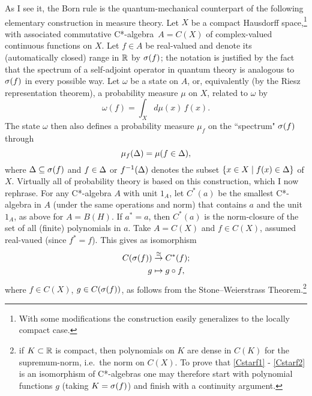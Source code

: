 \documentclass[11pt,a4paper]{article}
\numberwithin{equation}{section}
\newcommand{\er}{\eqref}
\newcommand{\beq}{\begin{equation}}
\newcommand{\eeq}{\end{equation}}
\newcommand{\raw}{\rightarrow}
\newcommand{\ca}{C*-algebra} \newcommand{\jba}{JB-algebra}
\newcommand{\om}{\omega} \newcommand{\Om}{\Omega}
\newcommand{\inv}{^{-1}}
\begin{document}
As I see it, the Born rule is the quantum-mechanical counterpart of the following elementary construction in measure theory. 
Let $X$ be a compact Hausdorff space,\footnote{With some modifications the construction easily generalizes to the locally compact case.} with associated commutative \ca\ $A=C(X)$ of complex-valued continuous functions on $X$. 
Let $f\in A$ be real-valued and denote its (automatically closed) range in ${\mathbb R}$ by $\sigma(f)$; the notation is justified by the fact that the spectrum of a self-adjoint operator in quantum theory is analogous to $\sigma(f)$ in every possible way. Let $\om$ be a state on $A$, or, equivalently (by the Riesz representation theorem), a probability measure $\mu$ on $X$, related to $\om$ by 
\beq
\om(f)=\int_X d\mu(x)\, f(x).
\eeq 
The state $\om$ then also defines a probability measure $\mu_f$ on the ``spectrum" $\sigma(f)$ through
  \begin{equation}
\mu_f(\Delta)=\mu(f\in \Delta), \label{muf}
\end{equation}
where  $\Delta\subseteq \sigma(f)$ and $f\in\Delta$ or $f\inv(\Dl)$ denotes the subset $\{x\in X\mid f(x)\in\Delta\}$ of $X$. Virtually all of probability theory is based on this construction, which I now rephrase. For any C*-algebra $A$ with unit $1_A$, let $C^*(a)$ be the smallest C*-algebra in $A$ (under the same operations and norm) that contains $a$ and the unit $1_A$, as above for $A=B(H)$.
 If $a^*=a$, then $C^*(a)$ is the norm-closure of the set of all (finite) polynomials in $a$.
Take $A=C(X)$  and $f\in C(X)$, assumed real-vaued (since $f^*=f$). This gives as isomorphism
\begin{align}
C(\sg(f))&\stackrel{\cong}{\raw} C^*(f); \label{Cstarf1}\\
g&\mapsto g\circ f,\label{Cstarf2}
\end{align} 
where $f\in C(X)$, $g\in C(\sigma(f))$, as follows from  the Stone--Weierstrass Theorem.\footnote{
if $K\subset{\mathbb R}$ is compact, then polynomials on $K$ are dense in $C(K)$ for the supremum-norm, i.e.\ the norm on $C(X)$. To prove  that \er{Cstarf1} - \er{Cstarf2} is an isomorphism of C*-algebras one may therefore start with polynomial functions $g$ (taking $K=\sigma(f)$) and finish with a continuity argument.}
\end{document}
